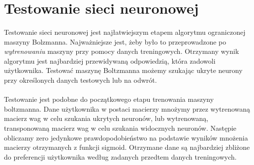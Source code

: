 \section{Testowanie sieci neuronowej}
    \paragraph{}
	Testowanie sieci neuronowej jest najłatwiejszym etapem algorytmu ograniczonej maszyny Bolzmanna. Najważniejsze jest, żeby było to przeprowadzone po  		\textit{wytrenowaniu} maszyny przy pomocy danych treningowych. Otrzymany wynik algorytmu jest najbardziej przewidywaną odpowiedzią, która zadowoli 			użytkownika. Testować maszynę Boltzmanna możemy szukając ukryte neurony przy określonych danych testowych lub na odwrót.
    \paragraph{}
	Testowanie jest podobne do początkowego etapu trenowania maszyny boltzmanna. Dane użytkownika w postaci macierzy mnożymy przez wytrenowaną 			macierz wag w celu szukania ukrytych neuronów, lub wytrenowaną, transponowaną macierz wag w celu szukania widocznych neuronów. Następie obliczamy 		zero jedynkowe prawdopodobieństwo na podstawie wyników mnożenia macierzy otrzymanych z funkcji sigmoid. Otrzymane dane są najbardziej zbliżone do 		preferencji użytkownika według zadanych przedtem danych treningowych.